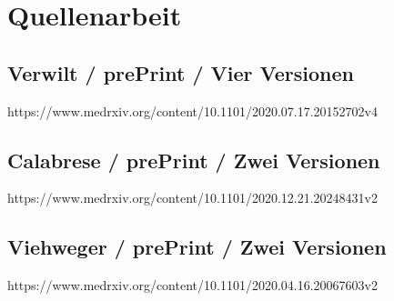 \chapter{Quellenarbeit}

\section{Verwilt / prePrint / Vier Versionen}
https://www.medrxiv.org/content/10.1101/2020.07.17.20152702v4


\section{Calabrese / prePrint / Zwei Versionen}
https://www.medrxiv.org/content/10.1101/2020.12.21.20248431v2


\section{Viehweger / prePrint / Zwei Versionen}
https://www.medrxiv.org/content/10.1101/2020.04.16.20067603v2
